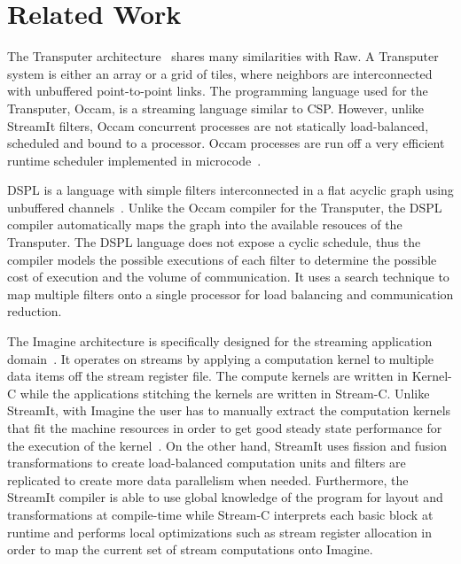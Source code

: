\section{Related Work}
\label{sec:related}

The Transputer architecture~\cite{transputer88} shares many
similarities with Raw.  A Transputer system is either an array or a
grid of tiles, where neighbors are interconnected with unbuffered
point-to-point links. The programming language used for the
Transputer, Occam, is a streaming language similar to CSP.  However,
unlike StreamIt filters, Occam concurrent processes are not statically
load-balanced, scheduled and bound to a processor. Occam processes are
run off a very efficient runtime scheduler implemented in
microcode~\cite{may87communicating}.

DSPL is a language with simple filters interconnected in a flat acyclic
graph using unbuffered channels~\cite{Thiel93}.  Unlike the Occam
compiler for the Transputer, the DSPL compiler automatically maps the
graph into the available resouces of the Transputer. The DSPL language
does not expose a cyclic schedule, thus the compiler models the
possible executions of each filter to determine the possible cost of
execution and the volume of communication. It uses a search technique
to map multiple filters onto a single processor for load balancing and
communication reduction. 

The Imagine architecture is specifically designed for the streaming
application domain~\cite{rixner98bandwidthefficient}.  It operates on
streams by applying a computation kernel to multiple data items off
the stream register file.  The compute kernels are written in Kernel-C
while the applications stitching the kernels are written in Stream-C.
Unlike StreamIt, with Imagine the user has to manually extract the
computation kernels that fit the machine resources in order to get
good steady state performance for the execution of the
kernel~\cite{kapasi:2001:ss}.  On the other hand, StreamIt uses
fission and fusion transformations to create load-balanced computation
units and filters are replicated to create more data parallelism when
needed.  Furthermore, the StreamIt compiler is able to use global
knowledge of the program for layout and transformations at
compile-time while Stream-C interprets each basic block at runtime and
performs local optimizations such as stream register allocation in
order to map the current set of stream computations onto Imagine.

